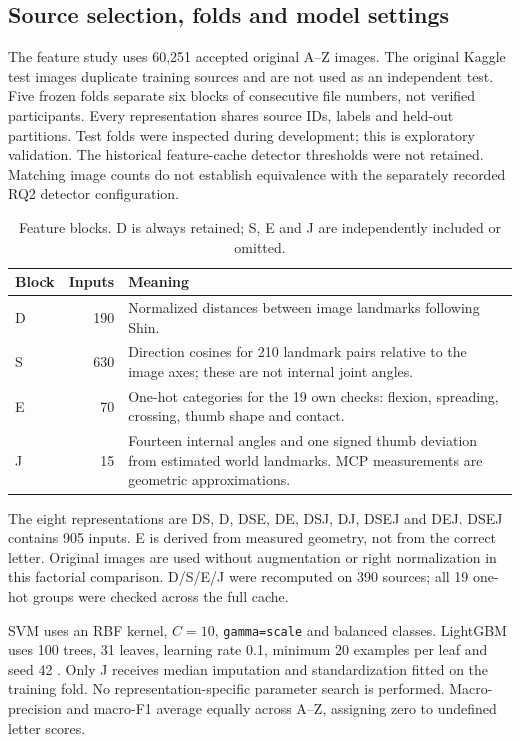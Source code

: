 \subsection{Source selection, folds and model settings}
The feature study uses 60,251 accepted original A--Z images. The original Kaggle test images duplicate training sources and are not used as an independent test. Five frozen folds separate six blocks of consecutive file numbers, not verified participants. Every representation shares source IDs, labels and held-out partitions. Test folds were inspected during development; this is exploratory validation. The historical feature-cache detector thresholds were not retained. Matching image counts do not establish equivalence with the separately recorded RQ2 detector configuration.

\begin{table}[h]\centering\small
\caption{Feature blocks. D is always retained; S, E and J are independently included or omitted.}
\begin{tabular}{lrp{.70\linewidth}}\toprule
Block & Inputs & Meaning\\\midrule
D & 190 & Normalized distances between image landmarks following Shin.\\
S & 630 & Direction cosines for 210 landmark pairs relative to the image axes; these are not internal joint angles.\\
E & 70 & One-hot categories for the 19 own checks: flexion, spreading, crossing, thumb shape and contact.\\
J & 15 & Fourteen internal angles and one signed thumb deviation from estimated world landmarks. MCP measurements are geometric approximations.\\\bottomrule
\end{tabular}
\end{table}

The eight representations are DS, D, DSE, DE, DSJ, DJ, DSEJ and DEJ. DSEJ contains 905 inputs. E is derived from measured geometry, not from the correct letter. Original images are used without augmentation or right normalization in this factorial comparison. D/S/E/J were recomputed on 390 sources; all 19 one-hot groups were checked across the full cache.

SVM uses an RBF kernel, $C=10$, \texttt{gamma=scale} and balanced classes. LightGBM uses 100 trees, 31 leaves, learning rate 0.1, minimum 20 examples per leaf and seed 42 \citep{ton-lightgbmdocs}. Only J receives median imputation and standardization fitted on the training fold. No representation-specific parameter search is performed. Macro-precision and macro-F1 average equally across A--Z, assigning zero to undefined letter scores.

